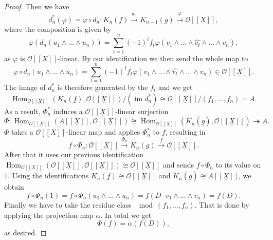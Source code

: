 \documentclass{article}
\theoremstyle{plain}%
\theoremstyle{definition}
\theoremstyle{remark}
\newcommand{\im}{\operatorname{im}}
\renewcommand{\hom}{\operatorname{Hom}}
\begin{document}
\begin{proof}
    Then we have
    \[
        d_n^*(\varphi) = \varphi \circ d_n \colon K_n(\underline{f}) \xrightarrow{d_n} K_{n-1}(g) \xrightarrow{\varphi} 
        \mathcal{O}[[\underline{X}]],  
    \]
    where the composition is given by 
    \[
        \varphi(d_n(u_1 \wedge \dots \wedge u_n)) = \sum_{t=1}^n (-1)^t f_t 
        \varphi(v_1 \wedge \dots \wedge \widehat{v_t} \wedge \dots \wedge v_n), 
    \]
    as \(\varphi\) is \(\mathcal{O}[[\underline{X}]]\)-linear.
    By our identification we then send the whole map to 
    \[
        \varphi \circ d_n(u_1\wedge\dots\wedge u_n) = \sum_{t=1}^n (-1)^t f_t 
        \varphi(v_1 \wedge \dots \wedge \widehat{v_t} \wedge \dots \wedge v_n) \in \mathcal{O}[[\underline{X}]].
    \]
    The image of \(d_n^*\) is therefore generated by the \(f_t\) and we get 
    \[
        \hom_{\mathcal{O}[[\underline{X}]]}(K_n(\underline{f}), \mathcal{O}[[\underline{X}]])/(\im d_n^*) 
        \cong \mathcal{O}[[\underline{X}]]/(f_1, \dots, f_n) = A.
    \]
    As a result, \(\Phi_n^*\) induces a \(\mathcal{O}[[\underline{X}]]\)-linear surjection
    \[
        \Phi\colon \hom_{\mathcal{O}[[\underline{X}]]}(A[[\underline{X}]], \mathcal{O}[[\underline{X}]]) \cong 
        \hom_{\mathcal{O}[[\underline{X}]]}(K_n(\underline{g}), \mathcal{O}[[\underline{X}]]) \twoheadrightarrow A.
    \]
    \(\Phi\) takes a \(\mathcal{O}[[\underline{X}]]\)-linear map and applies \(\Phi_n^*\) to \(f\), resulting in 
    \[
        f \circ \Phi_n\colon \mathcal{O}[[\underline{X}]] \xrightarrow{\Phi_n} K_n(g) 
        \xrightarrow{f} \mathcal{O}[[\underline{X}]].
    \]
    After that it uses our previous identification 
    \(\hom_{\mathcal{O}[[\underline{X}]]}(\mathcal{O}[[\underline{X}]], \mathcal{O}[[\underline{X}]])
    \cong \mathcal{O}[[\underline{X}]]\) 
    and sends \(f \circ \Phi_n\) to its value on \(1\). Using the identifications 
    \(K_n(\underline{f})\cong \mathcal{O}[[\underline{X}]]\) and \(K_n(\underline{g})\cong A[[\underline{X}]]\), we obtain
    \[
        f \circ \Phi_n(1) = f \circ \Phi_n(u_1\wedge\dots\wedge u_n) = f(D\cdot v_1\wedge\dots\wedge v_n) = f(D).
    \]
    Finally we have to take the residue class \(\!\!\!\mod (f_1, \dots, f_n)\). 
    That is done by applying the projection map \(\alpha\). In total we get
    \[
        \Phi(f) = \alpha(f(D)),  
    \]
    as desired.
\end{proof}
\end{document}
